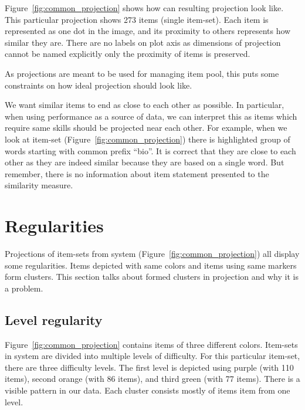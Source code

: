 \documentclass[
  printed, %
  table,   %
  nolof,     %
  nolot,     %
  color,
  final,
  nocover
]{fithesis3}
\begin{document}

Figure~\ref{fig:common_projection} shows how can resulting projection look like. This particular projection shows 273 items (single item-set). Each item is represented as one dot in the image, and its proximity to others represents how similar they are. There are no labels on plot axis as dimensions of projection cannot be named explicitly only the proximity of items is preserved.


As projections are meant to be used for managing item pool, this puts some constraints on how ideal projection should look like.

We want similar items to end as close to each other as possible. In particular, when using performance as a source of data, we can interpret this as items which require same skills should be projected near each other. For example, when we look at item-set \cviceniB{} (Figure~\ref{fig:common_projection}) there is highlighted group of words starting with common prefix ``bio''. It is correct that they are close to each other as they are indeed similar because they are based on a single word. But remember, there is no information about item statement presented to the similarity measure.


\section{Regularities}\label{regularities}


Projections of item-sets from system \umimeCesky{} (Figure~\ref{fig:common_projection}) all display some regularities. Items depicted with same colors and items using same markers form clusters. This section talks about formed clusters in projection and why it is a problem.


\subsection{Level regularity}\label{regularities-level-regularity}


Figure~\ref{fig:common_projection} contains items of three different colors. Item-sets in system \umimeCesky{} are divided into multiple levels of difficulty. For this particular item-set, there are three difficulty levels. The first level is depicted using purple (with 110 items), second orange (with 86 items), and third green (with 77 items). There is a  visible pattern in our data. Each cluster consists mostly of items item from one level.
\end{document}

